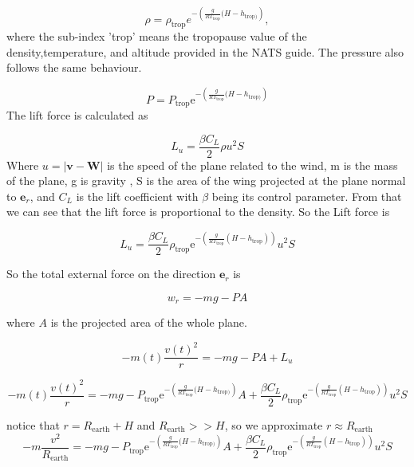 \documentclass{article}
\renewcommand{\vec}[1]{\boldsymbol{#1}}
\begin{document}
\begin{equation}
    \rho= \rho_{\text{trop}}e^{-\left( \frac{g}{RT_{\text{trop}}}(H-h_{\text{trop})} \right)},
\end{equation}
where the sub-index 'trop' means the tropopause value of the density,temperature, and altitude provided in the NATS guide. The pressure also follows the same behaviour.

\begin{equation}
    P= P_{\text{trop}}\mathrm{e}^{-\left( \frac{g}{RT_{\text{trop}}}(H-h_{\text{trop})} \right)}
\end{equation}
The lift force is calculated as

\begin{equation}
    L_u= \frac{\beta C_L}{2} \rho u^2S
\end{equation}
Where $u=|\vec{v}-\vec{W}|$ is the speed of the plane related to the wind, m is the mass of the plane, g is gravity , S is the area of the wing  projected at the plane normal to $\vec{e}_r$, and $C_L$ is the lift coefficient with $\beta$ being its control parameter. From that we can see that the lift force is proportional to the density.  So the Lift force is 

\begin{equation}
    L_u= \frac{\beta C_L}{2} \rho_{\text{trop}}\mathrm{e}^{-\left( \frac{g}{RT_{\text{trop}}}(H-h_{\text{trop}}) \right)} u^2S
\end{equation}

So the total external force on the direction $\vec{e}_r$ is 

\begin{equation}
    w_r=-mg -PA 
\end{equation}

where $A$ is the projected area of the whole plane.

\begin{equation}
    -m(t)\frac{v(t)^2}{r}=-mg- PA +L_u
\end{equation}

\begin{equation}
     -m(t)\frac{v(t)^2}{r}=-mg-  P_{\text{trop}}\mathrm{e}^{-\left( \frac{g}{RT_{\text{trop}}}(H-h_{\text{trop})} \right)}A +\frac{\beta C_L}{2} \rho_{\text{trop}}\mathrm{e}^{-\left( \frac{g}{RT_{\text{trop}}}(H-h_{\text{trop}}) \right)} u^2S
   \end{equation}

notice that $r=R_{\text{earth}}+H$ and $R_{\text{earth}}>> H$, so we approximate $r\approx R_{\text{earth}}$
\begin{equation}
    -m\frac{v^2}{R_{\text{earth}}}= -mg-  P_{\text{trop}}\mathrm{e}^{-\left( \frac{g}{RT_{\text{trop}}}(H-h_{\text{trop})} \right)}A +\frac{\beta C_L}{2} \rho_{\text{trop}}\mathrm{e}^{-\left( \frac{g}{RT_{\text{trop}}}(H-h_{\text{trop}}) \right)} u^2S
\end{equation}
\end{document}
